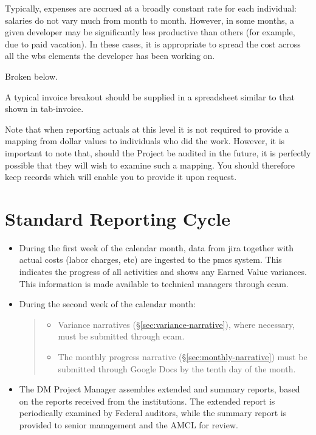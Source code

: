 Typically, expenses are accrued at a broadly constant rate for each individual: salaries do not vary much from month to month.
However, in some months, a given developer may be significantly less productive than others (for example, due to paid vacation).
In these cases, it is appropriate to spread the cost across all the \gls{wbs} \glspl{element} the developer has been working on.

\begin{note}
Broken below.
\end{note}
A typical invoice breakout should be supplied in a spreadsheet similar to that shown in tab-invoice.

Note that when reporting actuals at this level it is not required to
provide a mapping from dollar values to individuals who did the work.
However, it is important to note that, should the Project be audited in
the future, it is perfectly possible that they will wish to examine such
a mapping. You should therefore keep records which will enable you to
provide it upon request.

\section{Standard Reporting Cycle}
\label{sec:reporting-cycle}

\begin{itemize}
\item
  During the first week of the calendar month, data from \gls{jira} together with actual costs (labor charges, etc) are ingested to the \gls{pmcs} system.
  This indicates the progress of all activities and shows any Earned Value variances.
  This information is made available to technical managers through \gls{ecam}.
\item
  During the second week of the calendar month:

  \begin{quote}
  \begin{itemize}
  \item
    Variance narratives (\S\ref{sec:variance-narrative}), where necessary, must be submitted through \gls{ecam}.
  \item
    The monthly progress narrative (\S\ref{sec:monthly-narrative}) must be submitted through Google Docs by the tenth day of the month.
  \end{itemize}
  \end{quote}
\item
  The DM Project Manager assembles extended and summary reports, based
  on the reports received from the institutions. The extended report is
  periodically examined by Federal auditors, while the summary report is
  provided to senior management and the AMCL for review.
\end{itemize}

